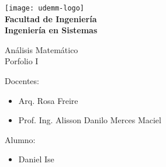 \begin{titlepage}
	\begin{center}
		\vspace*{0.5cm}
		\texttt{[image: udemm-logo]}\\
		\vspace{0.2cm}
		\Large
		\textbf{Facultad de Ingeniería}\\
		\textbf{Ingeniería en Sistemas}\\
		\hline
		\vspace{2cm}

		\Huge
		Análisis Matemático\\
		Porfolio I
		\vfill

		\raggedright
		\Large
		Docentes:
		\begin{itemize}
			\item[] Arq. Rosa Freire\\
			\item[] Prof. Ing. Alisson Danilo Merces Maciel\\
		\end{itemize}
		Alumno: 
		\begin{itemize}
			\item[] Daniel Ise
		\end{itemize}
		\vspace{1cm}

	\end{center}
\end{titlepage}
